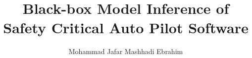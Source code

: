 \author{Mohammad Jafar Mashhadi Ebrahim}
\title{Black-box Model Inference of Safety Critical Auto Pilot Software}




\makethesistitle
